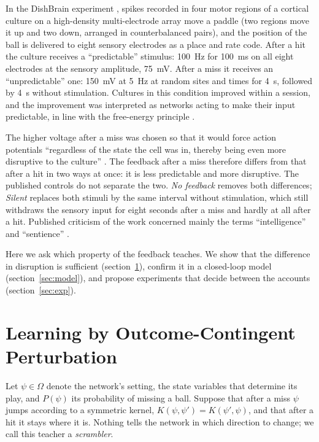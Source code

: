 \documentclass[12pt]{article}
\numberwithin{equation}{section}
\begin{document}
In the DishBrain experiment \citep{Kagan2022}, spikes recorded in four motor regions of a cortical culture on a high-density multi-electrode array move a paddle (two regions move it up and two down, arranged in counterbalanced pairs), and the position of the ball is delivered to eight sensory electrodes as a place and rate code. After a hit the culture receives a ``predictable'' stimulus: 100~Hz for 100~ms on all eight electrodes at the sensory amplitude, 75~mV. After a miss it receives an ``unpredictable'' one: 150~mV at 5~Hz at random sites and times for 4~s, followed by 4~s without stimulation. Cultures in this condition improved within a session, and the improvement was interpreted as networks acting to make their input predictable, in line with the free-energy principle \citep{Friston2010,Kagan2022}.

The higher voltage after a miss was chosen so that it would force action potentials ``regardless of the state the cell was in, thereby being even more disruptive to the culture'' \citep{Kagan2022}. The feedback after a miss therefore differs from that after a hit in two ways at once: it is less predictable and more disruptive. The published controls do not separate the two. \emph{No feedback} removes both differences; \emph{Silent} replaces both stimuli by the same interval without stimulation, which still withdraws the sensory input for eight seconds after a miss and hardly at all after a hit. Published criticism of the work concerned mainly the terms ``intelligence'' and ``sentience'' \citep{Balci2023,Kagan2023reply}.

Here we ask which property of the feedback teaches. We show that the difference in disruption is sufficient (section~\ref{sec:theory}), confirm it in a closed-loop model (section~\ref{sec:model}), and propose experiments that decide between the accounts (section~\ref{sec:exp}).

\section{Learning by Outcome-Contingent Perturbation}\label{sec:theory}

Let $\psi\in\Omega$ denote the network's setting, the state variables that determine its play, and $P(\psi)$ its probability of missing a ball. Suppose that after a miss $\psi$ jumps according to a symmetric kernel, $K(\psi,\psi')=K(\psi',\psi)$, and that after a hit it stays where it is. Nothing tells the network in which direction to change; we call this teacher a \emph{scrambler}.
\end{document}
